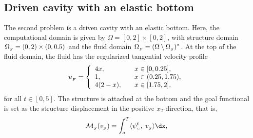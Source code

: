 \begin{figure}
\end{figure}

\subsection{Driven cavity with an elastic bottom}

The second problem is a driven cavity with an elastic bottom. Here,
the computational domain is given by $\Omega = [0,2]\times [0,2]$,
with structure domain $\Omega_{_{S}} = (0, 2)\times (0, 0.5)$ and the fluid
domain $\Omega_{_{F}} = (\Omega\setminus \Omega_{_{S}})^{\circ}$. At the top of the fluid
domain, the fluid has the regularized tangential velocity profile
\begin{equation}
u_{_{F}} =
\left\{
\begin{array}{lcl}
4x,& &x\in[0, 0.25],\\
1,& &x\in(0.25 ,1.75),\\
4(2-x),&  &x\in[1.75, 2],
\end{array}
\right.
\end{equation}
for all $t \in [0,5]$. The structure is attached at the bottom and the
goal functional is set as the structure displacement in the positive
$x_2$-direction, that is,
\begin{equation}
\label{selim:eq:goalfunctional_cavity}
\M_{_{S}}(v_{_{S}}) = \int_o^T \langle \psi^t_{_{S}},\; v_{_{S}}\rangle \dx,
\end{equation}

